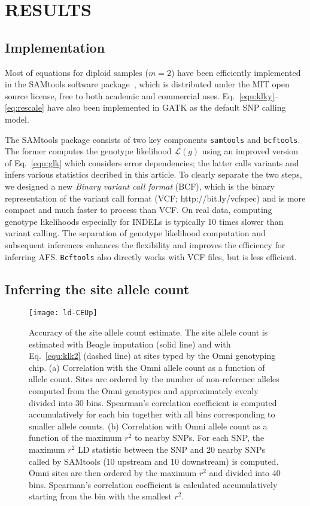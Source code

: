 \documentclass{bioinfo}
\begin{document}
\section{RESULTS}
\subsection{Implementation}
Most of equations for diploid samples ($m=2$) have been efficiently implemented
in the SAMtools software package~\citep{Li:2009ys}, which is distributed under the MIT open source license,
free to both academic and commercial uses. Eq.~\eqref{equ:klky}--\eqref{eq:rescale}
have also been implemented in GATK as the default SNP calling model.

The SAMtools package consists of two key components {\tt samtools} and {\tt bcftools}.
The former computes the genotype likelihood $\mathcal{L}(g)$ using an improved version of
Eq.~\eqref{equ:glk} which considers error dependencies; the latter calls variants
and infers various statistics decribed in this article. To clearly separate the two steps,
we designed a new \emph{Binary variant call format} (BCF), which is the binary representation
of the variant call format (VCF; http://bit.ly/vcfspec) and is more compact and much faster to process than VCF.
On real data, computing genotype likelihoods especially for INDELs is typically 10 times slower than
variant calling. The separation of genotype likelihood computation and subsequent
inferences enhances the flexibility and improves the efficiency for inferring
AFS. {\tt Bcftools} also directly works with VCF files, but is less efficient.

\subsection{Inferring the site allele count}

\begin{figure}[!htb]
\centering
\texttt{[image: ld-CEUp]}
\caption{Accuracy of the site allele count estimate. The site allele count
is estimated with Beagle imputation (solid line) and with Eq.~\eqref{equ:klk2} (dashed line)
at sites typed by the Omni genotyping chip. (a) Correlation with the Omni allele count
as a function of allele count. Sites are ordered by the number of non-reference alleles
computed from the Omni genotypes and approximately evenly divided into 30 bins.
Spearman's correlation coefficient is computed accumulatively for each bin together
with all bins corresponding to smaller allele counts. (b) Correlation with Omni allele count
as a function of the maximum $r^2$ to nearby SNPs. For each SNP, the maximum $r^2$ LD statistic between the SNP and
20 nearby SNPs called by SAMtools (10 upstream and 10 downstream) is computed. Omni sites
are then ordered by the maximum $r^2$ and divided into 40 bins. Spearman's correlation
coefficient is calculated accumulatively starting from the bin with the smallest $r^2$.}\label{fig:ac}
\end{figure}
\end{document}
